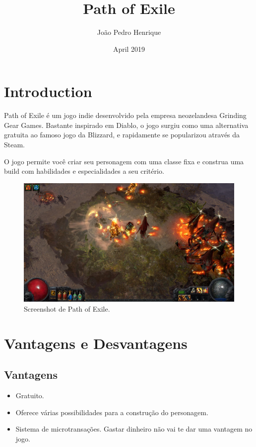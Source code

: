 \documentclass{article}
\title{Path of Exile}
\author{João Pedro Henrique}
\date{April 2019}
\begin{document}
\maketitle

\section{Introduction}
Path of Exile é um jogo indie desenvolvido pela empresa neozelandesa Grinding Gear Games. Bastante inspirado em Diablo, o jogo surgiu como uma alternativa gratuita ao famoso jogo da Blizzard, e rapidamente se popularizou através da Steam. \cite{poe}

O jogo permite você criar seu personagem com uma classe fixa e construa uma build com habilidades e especialidades a seu critério.

\begin{figure}[h!]
\centering
\includegraphics[scale=0.15]{path-of-exile}
\caption{Screenshot de Path of Exile.}
\label{fig:universe}
\end{figure}

\section{Vantagens e Desvantagens}
\subsection{Vantagens}
\begin{itemize}
    \item Gratuito.
    \item Oferece várias possibilidades para a construção do personagem.
    \item Sistema de microtransações. Gastar dinheiro não vai te dar uma vantagem no jogo.
\end{itemize}
\end{document}
